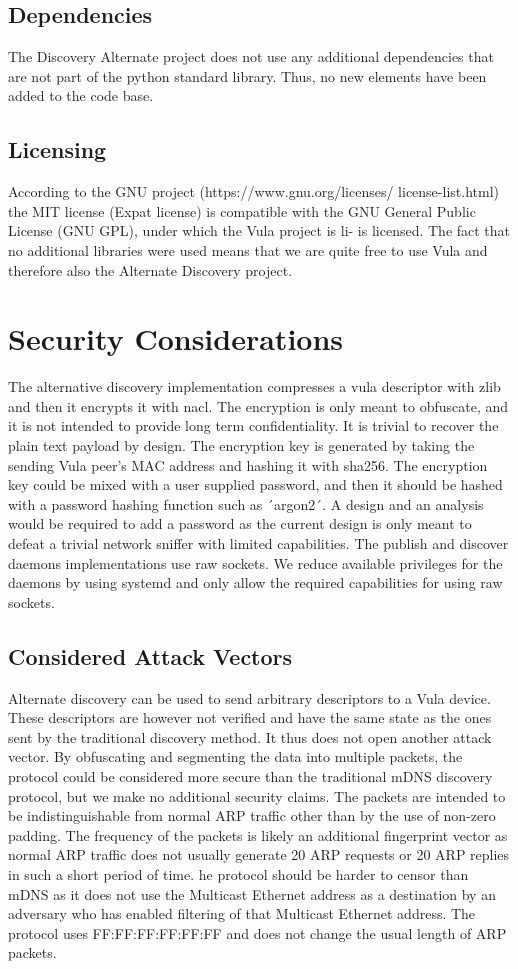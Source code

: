 \documentclass[a4paper,11pt]{report}
\begin{document}
\section{Dependencies}
The Discovery Alternate project does not use any additional dependencies that are not part of the python standard library. Thus, no new elements have been added to the code base.
\section{Licensing}
According to the GNU project (https://www.gnu.org/licenses/
license-list.html) the MIT license (Expat license) is compatible with
the GNU General Public License (GNU GPL), under which the Vula project is li-
is licensed.
The fact that no additional libraries were used means that we are quite free to use Vula and therefore also the Alternate Discovery project.
\chapter{Security Considerations}
The alternative discovery implementation compresses a vula descriptor with zlib and then it encrypts it with nacl. The encryption is only meant to obfuscate, and it is not intended to provide long term confidentiality. It is trivial to recover the plain text payload by design. The encryption key is generated by taking the sending Vula peer's MAC address and hashing it with sha256.
The encryption key could be mixed with a user supplied password, and then it should be hashed with a password hashing function such as ´argon2´. A design and an analysis would be required to add a password as the current design is only meant to defeat a trivial network sniffer with limited capabilities.
The publish and discover daemons implementations use raw sockets. We reduce available privileges for the daemons by using systemd and only allow the required capabilities for using raw sockets.
\section{Considered Attack Vectors}
Alternate discovery can be used to send arbitrary descriptors to a Vula device. These descriptors are however not verified and have the same state as the ones sent by the traditional discovery method. It thus does not open another attack vector. By obfuscating and segmenting the data into multiple packets, the protocol could be considered more secure than the traditional mDNS discovery protocol, but we make no additional security claims. The packets are intended to be indistinguishable from normal ARP traffic other than by the use of non-zero padding. The frequency of the packets is likely an additional fingerprint vector as normal ARP traffic does not usually generate 20 ARP requests or 20 ARP replies in such a short period of time. he protocol should be harder to censor than mDNS as it does not use the Multicast Ethernet address as a destination by an adversary who has enabled filtering of that Multicast Ethernet address. The protocol uses FF:FF:FF:FF:FF:FF and does not change the usual length of ARP packets.
\newpage
\end{document}
